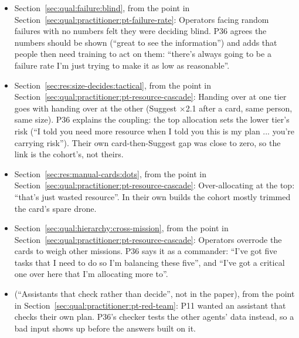 \begin{itemize}[leftmargin=1.2em,itemsep=1pt]
\item Section~\ref{sec:qual:failure:blind}, from the point in Section~\ref{sec:qual:practitioner:pt-failure-rate}: Operators facing random failures with no numbers felt they were deciding blind. P36 agrees the numbers should be shown (``great to see the information'') and adds that people then need training to act on them: ``there's always going to be a failure rate I'm just trying to make it as low as reasonable''.
\item Section~\ref{sec:res:size-decides:tactical}, from the point in Section~\ref{sec:qual:practitioner:pt-resource-cascade}: Handing over at one tier goes with handing over at the other (Suggest $\times$2.1 after a card, same person, same size). P36 explains the coupling: the top allocation sets the lower tier's risk (``I told you need more resource when I told you this is my plan ... you're carrying risk''). Their own card-then-Suggest gap was close to zero, so the link is the cohort's, not theirs.
\item Section~\ref{sec:res:manual-cards:dots}, from the point in Section~\ref{sec:qual:practitioner:pt-resource-cascade}: Over-allocating at the top: ``that's just wasted resource''. In their own builds the cohort mostly trimmed the card's spare drone.
\item Section~\ref{sec:qual:hierarchy:cross-mission}, from the point in Section~\ref{sec:qual:practitioner:pt-resource-cascade}: Operators overrode the cards to weigh other missions. P36 says it as a commander: ``I've got five tasks that I need to do so I'm balancing these five'', and ``I've got a critical one over here that I'm allocating more to''.
\item (``Assistants that check rather than decide'', not in the paper), from the point in Section~\ref{sec:qual:practitioner:pt-red-team}: P11 wanted an assistant that checks their own plan. P36's checker tests the other agents' data instead, so a bad input shows up before the answers built on it.
\end{itemize}
